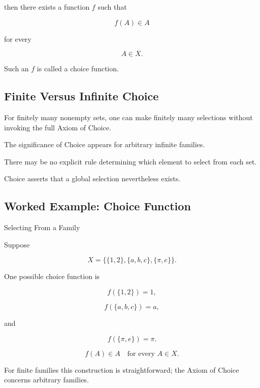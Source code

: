 then there exists a function \(f\) such that

\[
\boxed{
f(A)\in A
}
\]

for every

\[
A\in X.
\]

Such an \(f\) is called a choice function.

\subsection{Finite Versus Infinite Choice}
\label{subsec:finite-infinite-choice}

For finitely many nonempty sets, one can make finitely many selections
without invoking the full Axiom of Choice.

The significance of Choice appears for arbitrary infinite families.

There may be no explicit rule determining which element to select from each
set.

Choice asserts that a global selection nevertheless exists.

\subsection{Worked Example: Choice Function}
\label{subsec:worked-choice-function}

\begin{workedexamplebox}{Selecting From a Family}

Suppose

\[
X
=
\{
\{1,2\},
\{a,b,c\},
\{\pi,e\}
\}.
\]

One possible choice function is

\[
f(\{1,2\})=1,
\]

\[
f(\{a,b,c\})=a,
\]

and

\[
f(\{\pi,e\})=\pi.
\]

\begin{answerbox}
\[
\boxed{
f(A)\in A
\quad
\text{for every }A\in X.
}
\]
\end{answerbox}

For finite families this construction is straightforward; the Axiom of
Choice concerns arbitrary families.

\end{workedexamplebox}

